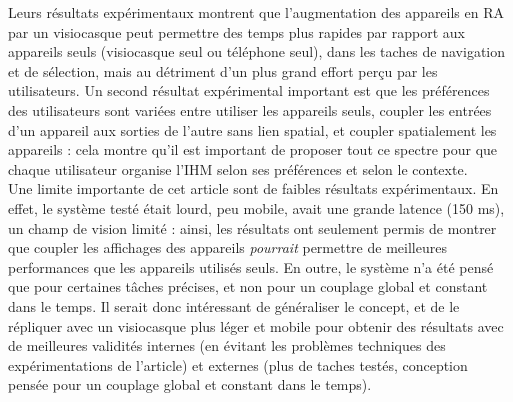 Leurs résultats expérimentaux montrent que l'augmentation des appareils en RA par un visiocasque peut permettre des temps plus rapides par rapport aux appareils seuls (visiocasque seul ou téléphone seul), dans les taches de navigation et de sélection, mais au détriment d'un plus grand effort perçu par les utilisateurs. Un second résultat expérimental important est que les préférences des utilisateurs sont variées entre utiliser les appareils seuls, coupler les entrées d'un appareil aux sorties de l'autre sans lien spatial, et coupler spatialement les appareils : cela montre qu'il est important de proposer tout ce spectre pour que chaque utilisateur organise l'IHM selon ses préférences et selon le contexte.\\
Une limite importante de cet article sont de faibles résultats expérimentaux. En effet, le système testé était lourd, peu mobile, avait une grande latence (150 ms), un champ de vision limité : ainsi, les résultats ont seulement permis de montrer que coupler les affichages des appareils \emph{pourrait} permettre de meilleures performances que les appareils utilisés seuls. En outre, le système n'a été pensé que pour certaines tâches précises, et non pour un couplage global et constant dans le temps. Il serait donc intéressant de généraliser le concept, et de le répliquer avec un visiocasque plus léger et mobile pour obtenir des résultats avec de meilleures validités internes (en évitant les problèmes techniques des expérimentations de l'article) et externes (plus de taches testés, conception pensée pour un couplage global et constant dans le temps).


